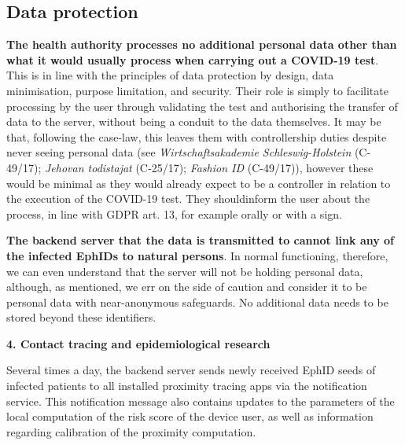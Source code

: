 \documentclass[12pt,a4paper]{article}
\begin{document}
\subsection*{Data protection}
\textbf{The health authority processes no additional personal data other than what it would usually process when carrying out a COVID-19 test}. This is in line with the principles of data protection by design, data minimisation, purpose limitation, and security. Their role is simply to facilitate processing by the user through validating the test and authorising the transfer of data to the server, without being a conduit to the data themselves. It may be that, following the case-law, this leaves them with controllership duties despite never seeing personal data (see \textit{Wirtschaftsakademie Schleswig-Holstein} (C-49/17); \textit{Jehovan todistajat} (C‑25/17); \textit{Fashion ID} (C-49/17)), however these would be minimal as they would already expect to be a controller in relation to the execution of the COVID-19 test. They shouldinform the user about the process, in line with GDPR art. 13, for example orally or with a sign.


\textbf{The backend server that the data is transmitted to cannot link any of the infected
EphIDs to natural persons}. In normal functioning, therefore, we can even understand that the server will not be holding personal data, although, as mentioned, we err on the side of caution and consider it to be personal data with near-anonymous safeguards. No additional data needs to be stored beyond these identifiers.


\textbf{4. Contact tracing and epidemiological research}


Several times a day, the backend server sends newly received EphID seeds of infected
patients to all installed proximity tracing apps via the notification service. This notification message also contains updates to the parameters of the local computation of the risk score of the device user, as well as information regarding calibration of the proximity computation.
\end{document}
